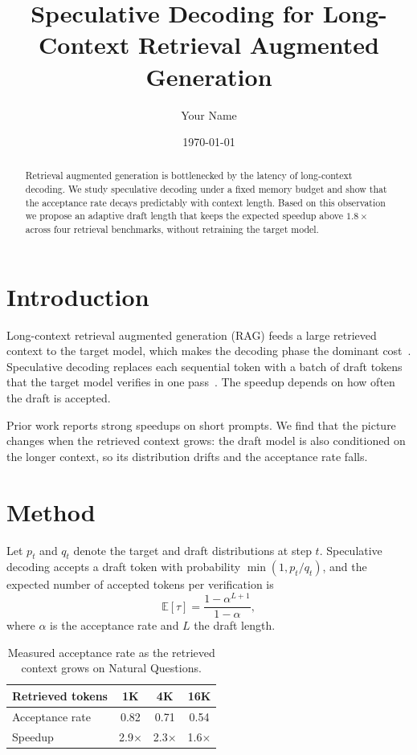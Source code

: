 \documentclass[11pt]{article}
\title{Speculative Decoding for Long-Context Retrieval Augmented Generation}
\author{Your Name}
\date{\today}
\begin{document}
\maketitle

\begin{abstract}
Retrieval augmented generation is bottlenecked by the latency of long-context decoding. We study speculative decoding under a fixed memory budget and show that the acceptance rate decays predictably with context length. Based on this observation we propose an adaptive draft length that keeps the expected speedup above $1.8\times$ across four retrieval benchmarks, without retraining the target model.
\end{abstract}

\section{Introduction}

Long-context retrieval augmented generation (RAG) feeds a large retrieved context to the target model, which makes the decoding phase the dominant cost~\cite{lewis2020rag}. Speculative decoding replaces each sequential token with a batch of draft tokens that the target model verifies in one pass~\cite{leviathan2023fast}. The speedup depends on how often the draft is accepted.

Prior work reports strong speedups on short prompts. We find that the picture changes when the retrieved context grows: the draft model is also conditioned on the longer context, so its distribution drifts and the acceptance rate falls.

\section{Method}

Let $p_t$ and $q_t$ denote the target and draft distributions at step $t$. Speculative decoding accepts a draft token with probability $\min(1, p_t/q_t)$, and the expected number of accepted tokens per verification is
\begin{equation}
  \mathbb{E}[\tau] = \frac{1 - \alpha^{L+1}}{1 - \alpha},
  \label{eq:expected}
\end{equation}
where $\alpha$ is the acceptance rate and $L$ the draft length.

\begin{table}[h]
  \centering
  \caption{Measured acceptance rate as the retrieved context grows on Natural Questions.}
  \label{tab:accept}
  \begin{tabular}{lccc}
    \toprule
    Retrieved tokens & 1K & 4K & 16K \\
    \midrule
    Acceptance rate & 0.82 & 0.71 & 0.54 \\
    Speedup & 2.9$\times$ & 2.3$\times$ & 1.6$\times$ \\
    \bottomrule
  \end{tabular}
\end{table}
\end{document}
